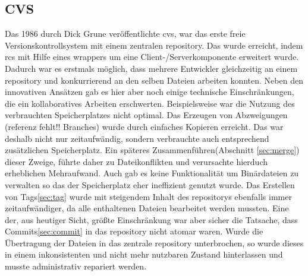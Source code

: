\subsection{CVS}\label{sec:cvs}
Das 1986 durch Dick Grune veröffentlichte \acrfull{cvs}, war das erste freie
Versionskontrollsystem mit einem zentralen \gls{repository}. Das wurde
erreicht, indem \acrshort{rcs} mit Hilfe eines \glspl{wrapper} um eine
Client-/Serverkomponente erweitert wurde. Dadurch war es erstmals möglich, dass
mehrere Entwickler gleichzeitig an einem \gls{repository} und konkurrierend an
den selben Dateien arbeiten konnten. Neben den innovativen Ansätzen gab es hier
aber noch einige technische Einschränkungen, die ein kollaboratives Arbeiten
erschwerten. Beispielsweise war die Nutzung des verbrauchten Speicherplatzes
nicht optimal. Das Erzeugen von Abzweigungen (referenz fehlt!!  Branches) wurde
durch einfaches Kopieren erreicht. Das war deshalb nicht nur zeitaufwändig,
sondern verbrauchte auch entsprechend zusätzlichen Speicherplatz. Ein späteres
Zusammenführen(Abschnitt \ref{sec:merge}) dieser Zweige, führte daher zu
Dateikonflikten und verursachte hierduch erheblichen Mehraufwand. Auch gab es
keine Funktionalität um Binärdateien zu verwalten so das der Speicherplatz eher
ineffizient genutzt wurde. Das Erstellen von Tags\ref{sec:tag} wurde mit
steigendem Inhalt des \glspl{repository} ebenfalls immer zeitaufwändiger, da
alle enthaltenen Dateien bearbeitet werden mussten. Eine der, aus heutiger
Sicht, größte Einschränkung war aber sicher die Tatsache, dass
Commits\ref{sec:commit} in das \gls{repository} nicht atomar waren. Wurde die
Übertragung der Dateien in das zentrale \gls{repository} unterbrochen, so wurde
dieses in einem inkonsistenten und nicht mehr nutzbaren Zustand hinterlassen
und musste administrativ repariert werden.\cite[S.~382-383]{cd}

